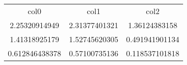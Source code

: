 \begin{table}
\begin{tabular}{ccc}
col0 & col1 & col2 \\
2.25320914949 & 2.31377401321 & 1.36124383158 \\
1.41318925179 & 1.52745620305 & 0.491941901134 \\
0.612846438378 & 0.57100735136 & 0.118537101818 \\
\end{tabular}
\end{table}
